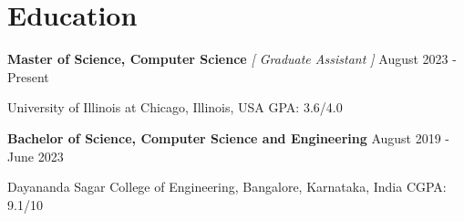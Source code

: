 \renewcommand{\subsection}[3]{
    \noindent\textbf{#1}  \emph{#2} \hfill #3 \break
}

\section{Education}
\subsection{Master of Science, Computer Science}{[ Graduate Assistant ]}{August 2023 - Present}
University of Illinois at Chicago, Illinois, USA \hfill GPA: 3.6/4.0

\subsection{Bachelor of Science, Computer Science and Engineering}{}{August 2019 - June 2023}
Dayananda Sagar College of Engineering, Bangalore, Karnataka, India \hfill CGPA: 9.1/10





